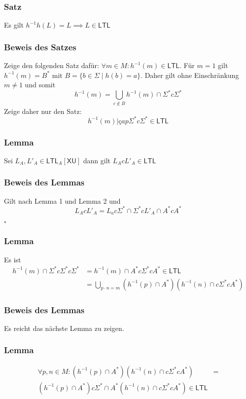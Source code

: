 \documentclass[12pt, german]{article}
\newcommand{\sigstern}{\Sigma^\ast}
\newcommand{\inv}{^{-1}}
\newcommand{\aast}{A^{\ast}}
\newcommand{\bast}{B^{\ast}}
\newcommand{\ltl}{\mathsf{LTL}}
\newcommand{\sX}{\mathsf{X}}
\newcommand{\sU}{\mathsf{U}}
\newcommand{\bewiesen}{
	
	\begin{flushright}
		$\square$  \\
\end{flushright}}
\begin{document}
\subsubsection{Satz}
	Es gilt $h\inv h(L) = L \implies L \in \ltl$

\subsubsection{Beweis des Satzes}
	Zeige den folgenden Satz dafür: $\forall m \in M : h\inv (m) \in \ltl$. Für $m = 1$ gilt $h\inv(m) = \bast$ mit $B = \{b \in \Sigma \mid h(b) = a \}$.
	Daher gilt ohne Einschränkung $m \not = 1$ und somit $$h\inv(m) = \bigcup_{c \not \in B } h\inv(m) \cap \sigstern c \sigstern$$ Zeige daher nur den Satz: 
	$$h\inv(m) |çap \sigstern c \sigstern \in \ltl$$

\subsubsection{Lemma}
	Sei $L_A, L'_A \in \ltl_A[\sX\sU]$ dann gilt $L_A c L'_A \in \ltl$

\subsubsection{Beweis des Lemmas}
	Gilt nach Lemma 1 und Lemma 2 und $$L_A c L'_A = L_a c \sigstern \cap \sigstern c L'_A \cap \aast c \aast$$
	\bewiesen

\subsubsection{Lemma}
	Es ist 
	\begin{align*}
	h\inv(m) \cap \sigstern c \sigstern c \sigstern &= h\inv(m) \cap \aast c \sigstern c \aast \in \ltl \\
	&= \bigcup_{p\cdot n = m}(h\inv(p) \cap \aast)(h\inv(n) \cap c \sigstern c \aast)
	\end{align*}

\subsubsection{Beweis des Lemmas}
	Es reicht das nächste Lemma zu zeigen.

\subsubsection{Lemma}
\begin{align*}
	\forall p, n \in M: (h\inv(p) \cap \aast)(h\inv(n) \cap c \sigstern c \aast) &= \\
	(h\inv(p) \cap \aast) c \sigstern \cap \aast(h\inv(n)\cap c \sigstern c \aast) \in \ltl 
	\end{align*}
\end{document}
